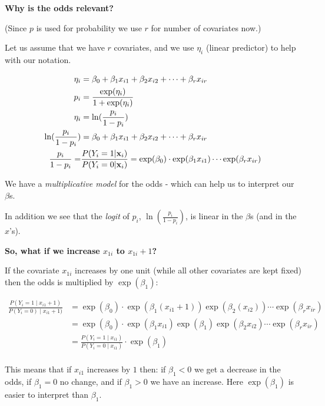 \documentclass[10pt,ignorenonframetext,]{beamer}
\begin{document}
\begin{frame}

\textbf{Why is the odds relevant?}

(Since \(p\) is used for probability we use \(r\) for number of
covariates now.)

Let us assume that we have \(r\) covariates, and we use \(\eta_i\)
(linear predictor) to help with our notation.

\begin{align*}
\eta_i&= \beta_0+\beta_1 x_{i1}+\beta_2 x_{i2}+\cdots + \beta_r x_{ir}\\
p_i&= \frac{\exp(\eta_i)}{1+\exp(\eta_i)}\\
\eta_i&=\ln(\frac{p_i}{1-p_i})\\
\ln(\frac{p_i}{1-p_i})&=\beta_0+\beta_1 x_{i1}+\beta_2 x_{i2}+\cdots + \beta_r x_{ir}\\
\frac{p_i}{1-p_i}=&\frac{P(Y_i=1|{\bf x}_i)}{P(Y_i=0|{\bf x}_i)}=\exp(\beta_0)\cdot \exp(\beta_1 x_{i1})\cdots\exp(\beta_r x_{ir})
\end{align*}

We have a \emph{multiplicative model} for the odds - which can help us
to interpret our \(\beta\)s.

In addition we see that the \emph{logit} of \(p_i\),
\(\ln(\frac{p_i}{1-p_i})\), is linear in the \(\beta\)s (and in the
\(x\)'s).

\end{frame}

\begin{frame}

\textbf{So, what if we increase \(x_{1i}\) to \(x_{1i}+1\)?}

If the covariate \(x_{1i}\) increases by one unit (while all other
covariates are kept fixed) then the odds is multiplied by
\(\exp(\beta_1)\):

\begin{align*}
\frac{P(Y_i=1\mid x_{i1}+1)}{P(Y_i=0)\mid x_{i1}+1)}&=\exp(\beta_0)\cdot \exp(\beta_1 (x_{i1}+1))\exp(\beta_2 (x_{i2}))\cdots\exp(\beta_r x_{ir})\\
&=\exp(\beta_0)\cdot \exp(\beta_1 x_{i1})\exp(\beta_1)\exp(\beta_2 x_{i2})\cdots\exp(\beta_r x_{ir})\\
&=\frac{P(Y_i=1\mid x_{i1})}{P(Y_i=0\mid x_{i1})}\cdot \exp(\beta_1)\\
\end{align*}

This means that if \(x_{i1}\) increases by \(1\) then: if \(\beta_1<0\)
we get a decrease in the odds, if \(\beta_1=0\) no change, and if
\(\beta_1>0\) we have an increase. Here \(\exp(\beta_1)\) is easier to
interpret than \(\beta_1\).

\end{frame}
\end{document}
